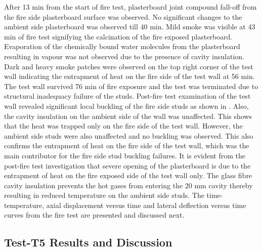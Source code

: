 After 13 min from the start of fire test, plasterboard joint compound fall-off from the fire side plasterboard surface was observed. No significant changes to the ambient side plasterboard was observed till 40 min. Mild smoke was visible at 43 min of fire test signifying the calcination of the fire exposed plasterboard. Evaporation of the chemically bound water molecules from the plasterboard resulting in vapour was not observed due to the presence of cavity insulation. Dark and heavy smoke patches were observed on the top right corner of the test wall indicating the entrapment of heat on the fire side of the test wall at 56 min. The test wall survived 76 min of fire exposure and the test was terminated due to structural inadequacy failure of the studs. Post-fire test examination of the test wall revealed significant local buckling of the fire side studs as shown in . Also, the cavity insulation on the ambient side of the wall was unaffected. This shows that the heat was trapped only on the fire side of the test wall. However, the ambient side studs were also unaffected and no buckling was observed. This also confirms the entrapment of heat on the fire side of the test wall, which was the main contributor for the fire side stud buckling failures. It is evident from the post-fire test investigation that severe opening of the plasterboard is due to the entrapment of heat on the fire exposed side of the test wall only. The glass fibre cavity insulation prevents the hot gases from entering the 20 mm cavity thereby resulting in reduced temperature on the ambient side studs. The time-temperature, axial displacement versus time and lateral deflection versus time curves from the fire test are presented and discussed next.

\subsection{Test-T5 Results and Discussion}

